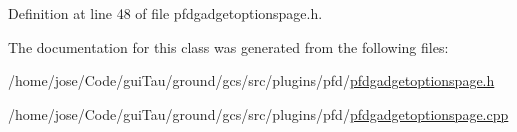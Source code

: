 Definition at line 48 of file pfdgadgetoptionspage.\-h.



The documentation for this class was generated from the following files\-:\begin{DoxyCompactItemize}
\item 
/home/jose/\-Code/gui\-Tau/ground/gcs/src/plugins/pfd/\hyperlink{pfdgadgetoptionspage_8h}{pfdgadgetoptionspage.\-h}\item 
/home/jose/\-Code/gui\-Tau/ground/gcs/src/plugins/pfd/\hyperlink{pfdgadgetoptionspage_8cpp}{pfdgadgetoptionspage.\-cpp}\end{DoxyCompactItemize}
